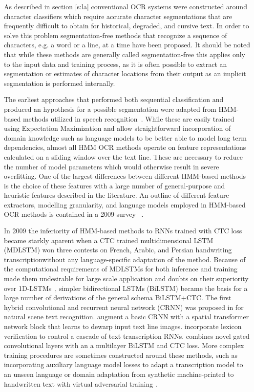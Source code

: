 As described in section \ref{s:la} conventional OCR systems were constructed
around character classifiers which require accurate character segmentations
that are frequently difficult to obtain for historical, degraded, and cursive
text. In order to solve this problem segmentation-free methods that recognize a
sequence of characters, e.g. a word or a line, at a time have been proposed. It
should be noted that while these methods are generally called segmentation-free
this applies only to the input data and training process, as it is often
possible to extract an segmentation or estimates of character locations from
their output as an implicit segmentation is performed internally.

The earliest approaches that performed both sequential classification and
produced an hypothesis for a possible segmentation were adapted from HMM-based
methods utilized in speech
recognition~\cite{kaltenmeier1993sophisticated,rigoll1996comparison}. While
these are easily trained using Expectation Maximization and allow
straightforward incorporation of domain knowledge such as language models to be
better able to model long term dependencies, almost all HMM OCR methods operate
on feature representations calculated on a sliding window over the text line.
These are necessary to reduce the number of model parameters which would
otherwise result in severe overfitting. One of the largest differences between
different HMM-based methods is the choice of these features with a large number
of general-purpose and heuristic features described in the literature. An
outline of different feature extractors, modelling granularity, and language
models employed in HMM-based OCR methods is contained in a 2009 survey
~\cite{plotz2009markov}.

In 2009 the inferiority of HMM-based methods to RNNs trained with CTC loss
became starkly aparent when a CTC trained multidimensional LSTM (MDLSTM)
\cite{graves2008offline} won three contests on French, Arabic, and Persian
handwriting transcriptionwithout any language-specific adaptation of the method.
Because of the computational requirements of MDLSTMs for both inference and
training made them undesirable for large scale application and doubts on their
superiority over 1D-LSTMs~\cite{puigcerver2017multidimensional}, simpler
bidirectional LSTMs (BiLSTM) \cite{graves2008novel} became the basis for a
large number of derivations of the general schema BiLSTM+CTC. The first hybrid
convolutional and recurrent neural network (CRNN) was proposed in
\cite{shi2016end} for natural scene text recognition. \cite{dutta2018improving}
augment a basic CRNN with a spatial transformer network block that learns to
dewarp input text line images. \cite{stuner2016cohort} incorporate lexicon
verification to control a cascade of text transcription RNNs.
\cite{bluche2017gated} combines novel gated convolutional layers with an a
multilayer BiLSTM and CTC loss. More complex training procedures are sometimes
constructed around these methods, such as incorporating auxiliary language
model losses to adapt a transcription model to an unseen language
\cite{tensmeyer2018language} or domain adaptation from synthetic
machine-printed to handwritten text with virtual adversarial training
\cite{keret2019transductive}.

